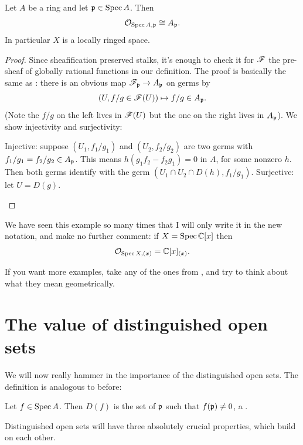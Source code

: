 \begin{theorem}
	Let $A$ be a ring and let $\mathfrak p \in \operatorname{Spec} A$.
	Then \[ \mathcal O_{\operatorname{Spec} A, \mathfrak p} \cong A_\mathfrak p. \]
	In particular $X$ is a locally ringed space.
\end{theorem}
\begin{proof}
	Since sheafification preserved stalks,
	it's enough to check it for $\mathscr F$ the pre-sheaf
	of globally rational functions in our definition.
	The proof is basically the same as :
	there is an obvious map $\mathscr F_\mathfrak p \to A_\mathfrak p$ on germs by
	\[ \left(U, f/g \in \mathscr F(U) \right)
		\mapsto f/g \in A_\mathfrak p . \]
	(Note the $f/g$ on the left lives in $\mathscr F(U)$
	but the one on the right lives in $A_\mathfrak p$).
	We show injectivity and surjectivity:
	\begin{itemize}
		\ii Injective: suppose $(U_1, f_1 / g_1)$ and $(U_2, f_2 / g_2)$
		are two germs with $f_1/g_1 = f_2/g_2 \in A_\mathfrak p$.
		This means $h(g_1 f_2 - f_2 g_1) = 0$ in $A$, for some nonzero $h$.
		Then both germs identify with
		the germ $(U_1 \cap U_2 \cap D(h), f_1 / g_1)$.
		\ii Surjective: let $U = D(g)$. \qedhere
	\end{itemize}
\end{proof}

\begin{example}
	We have seen this example so many times
	that I will only write it in the new notation,
	and make no further comment:
	if $X = \operatorname{Spec} \mathbb C[x]$ then
	\[ \mathcal O_{\operatorname{Spec} X, (x)} = \mathbb C[x]_{(x)}. \]
\end{example}

If you want more examples,
take any of the ones from ,
and try to think about what they mean geometrically.

\section{The value of distinguished open sets}

We will now really hammer in the importance of
the distinguished open sets.
The definition is analogous to before:
\begin{definition}
	Let $f \in \operatorname{Spec} A$.
	Then $D(f)$ is the set of $\mathfrak p$ such that $f(\mathfrak p) \neq 0$,
	a .
\end{definition}
Distinguished open sets will have three absolutely crucial properties,
which build on each other.

